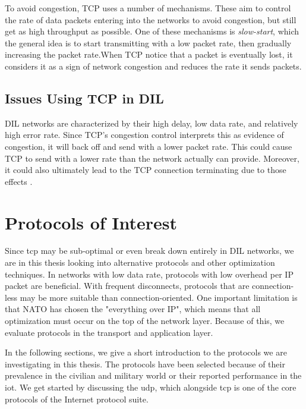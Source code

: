 To avoid congestion, TCP uses a number of mechanisms. These aim to control the
rate of data packets entering into the networks to avoid congestion, but still
get as high throughput as possible. One of these mechanisms is
\textit{slow-start}, which the general idea is to start transmitting with a low
packet rate, then gradually increasing the packet rate.When TCP notice that a
packet is eventually lost, it considers it as a sign of network congestion and
reduces the rate it sends packets.

\subsection{Issues Using TCP in DIL}
\label{section:tcp-problems}

DIL networks are characterized by their high delay, low data rate, and relatively
high error rate. Since TCP's congestion control interprets this as evidence of
congestion, it will back off and send with a lower packet rate. This could cause
TCP to send with a lower rate than the network actually can provide. Moreover,
it could also ultimately lead to the TCP connection terminating due to those
effects \cite{nato-disadvantaged-grids}.


\section{Protocols of Interest}

Since \gls{tcp} may be sub-optimal or even break down entirely in DIL networks,
we are in this thesis looking into alternative protocols and other optimization
techniques. In networks with low data rate, protocols with low overhead per IP
packet are beneficial. With frequent disconnects, protocols that are
connection-less may be more suitable than connection-oriented. One important
limitation is that NATO has chosen the "everything over IP", which means that
all optimization must occur on the top of the network layer. Because of this, we
evaluate protocols in the transport and application layer.

In the following sections, we give a short introduction to the protocols we are
investigating in this thesis. The protocols have been selected because of their
prevalence in the civilian and military world or their reported performance in
the \gls{iot}. We get started by discussing the \gls{udp}, which alongside
\gls{tcp} is one of the core protocols of the Internet protocol suite.


\subsection{}

